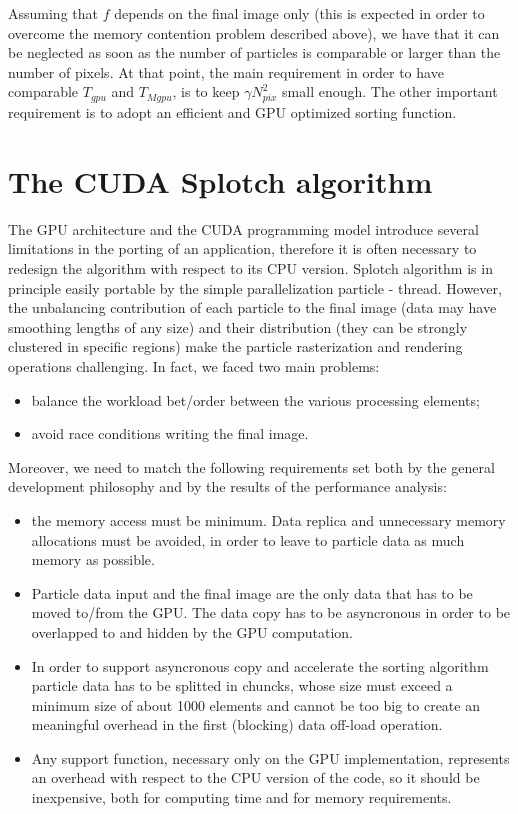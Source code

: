 \documentclass[11pt]{article}
\begin{document}
Assuming that $f$ depends on the final image only (this is expected in order 
to overcome the memory contention problem described above), we have that 
it can be neglected as soon as the number of particles is comparable or larger 
than the number of pixels. At that point, the main requirement in order 
to have comparable $T_{gpu}$ and $T_{Mgpu}$, is to keep $\gamma N_{pix}^2$
small enough. The other important requirement is to adopt an efficient 
and GPU optimized sorting function. 

\section{The CUDA Splotch algorithm}

The GPU architecture and the CUDA programming model introduce several limitations in the porting of an application, therefore it is often necessary to redesign the algorithm with respect to its CPU version. Splotch algorithm is in principle easily portable by the simple parallelization particle - thread. However, the unbalancing contribution of each particle to the final image (data may have smoothing lengths of any size) and their distribution (they can be strongly clustered in specific regions) make the particle rasterization and rendering operations challenging. 
In fact, we faced two main problems:
\begin{itemize}
\item 
balance the workload bet/order between the various processing elements;
\item
avoid race conditions writing the final image. 
\end{itemize}
Moreover, we need to match the following requirements set both by the general development philosophy and by the 
results of the performance analysis:
\begin{itemize}
\item
the memory access must be minimum. Data replica and unnecessary 
memory allocations must be avoided, in order to leave to particle
data as much memory as possible. 
\item
Particle data input and the final image are the only data that has to 
be moved to/from the GPU. The data copy has to be asyncronous in order
to be overlapped to and hidden by the GPU computation.
\item
In order to support asyncronous copy and accelerate the sorting algorithm
particle data has to be splitted in chuncks, whose size must exceed 
a minimum size of about 1000 elements and cannot be too big to create an
meaningful overhead in the first (blocking) data off-load operation.
\item
Any support function, necessary only on the GPU implementation, represents an overhead
with respect to the CPU version of the code, so it should be inexpensive,
both for computing time and for memory requirements. 
\end{itemize}
\end{document}
